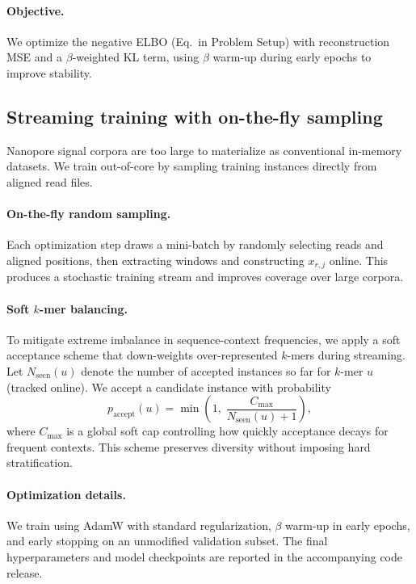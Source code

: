 \documentclass[sigconf, review]{acmart}
\begin{document}
\paragraph{Objective.}
We optimize the negative ELBO (Eq.\ in Problem Setup) with reconstruction MSE and a $\beta$-weighted
KL term, using $\beta$ warm-up during early epochs to improve stability.

\subsection{Streaming training with on-the-fly sampling}
Nanopore signal corpora are too large to materialize as conventional in-memory datasets. We train
out-of-core by sampling training instances directly from aligned read files.

\paragraph{On-the-fly random sampling.}
Each optimization step draws a mini-batch by randomly selecting reads and aligned positions, then
extracting windows and constructing $x_{r,j}$ online. This produces a stochastic training stream and
improves coverage over large corpora.

\paragraph{Soft $k$-mer balancing.}
To mitigate extreme imbalance in sequence-context frequencies, we apply a soft acceptance scheme
that down-weights over-represented $k$-mers during streaming. Let $N_{\text{seen}}(u)$ denote the
number of accepted instances so far for $k$-mer $u$ (tracked online). We accept a candidate instance
with probability
\begin{equation}
p_{\text{accept}}(u) = \min\!\left(1,\; \frac{C_{\max}}{N_{\text{seen}}(u)+1}\right),
\end{equation}
where $C_{\max}$ is a global soft cap controlling how quickly acceptance decays for frequent contexts.
This scheme preserves diversity without imposing hard stratification.

\paragraph{Optimization details.}
We train using AdamW with standard regularization, $\beta$ warm-up in early epochs, and early
stopping on an unmodified validation subset. The final hyperparameters and model checkpoints are
reported in the accompanying code release.
\end{document}
